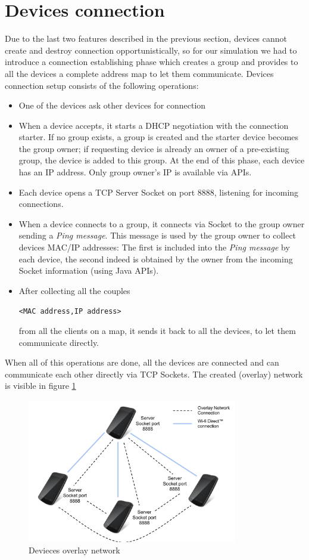 \section{Devices connection}

Due to the last two \direct features described in the previous section, devices cannot create and destroy connection opportunistically, so for our simulation we had to introduce a connection establishing phase which creates a \direct group and provides to all the devices a complete address map to let them communicate.
Devices connection setup consists of the following operations:
	\begin{itemize}
		\item One of the devices ask other devices for connection
		\item When a device accepts, it starts a DHCP negotiation with the connection starter. If no \direct group exists, a group is created and the starter device becomes the group owner; if requesting device is already an owner of a pre-existing group, the device is added to this group. At the end of this phase, each device has an IP address. Only group owner's IP is available via APIs. 
		\item Each device opens a TCP Server Socket on port 8888, listening for incoming connections.
		\item When a device connects to a group, it connects via Socket to the group owner sending a \emph{Ping message}. This message is used by the group owner to collect devices MAC/IP addresses: The first is included into the \emph{Ping message} by each device, the second indeed is obtained by the owner from the incoming Socket information (using Java APIs).
		\item After collecting all the couples \begin{center}\tt{<MAC address,IP address>}\end{center} from all the clients on a map, it sends it back to all the devices, to let them communicate directly.
	\end{itemize}
	
When all of this operations are done, all the devices are connected and can communicate each other directly via TCP Sockets. The created (overlay) network is visible in figure \ref{fig:device_network}

\begin{figure}[!htbp]
\centering
\includegraphics[width=3.6in]{imgs/Devices_network.pdf}
\caption{Devieces overlay network}
\label{fig:device_network}
\end{figure}
